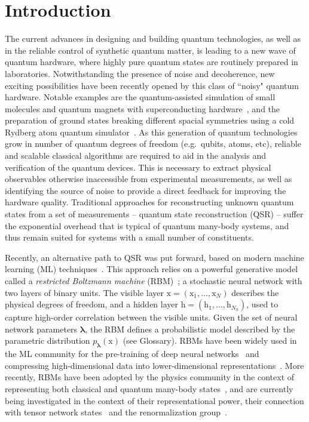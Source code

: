 \documentclass[submission, Phys, hidelinks]{SciPost}
\begin{document}
\section{Introduction}
The current advances in designing and building quantum technologies, as well as in the reliable control of synthetic quantum matter, is leading to a new wave of quantum hardware, where highly pure quantum states are routinely prepared in laboratories. Notwithstanding the presence of noise and decoherence, new exciting possibilities have been recently opened by this class of ``noisy" quantum hardware. Notable examples are the quantum-assisted simulation of small molecules and quantum magnets with superconducting hardware~\cite{gambetta17,gambetta18}, and the preparation of ground states breaking different spacial symmetries using a cold Rydberg atom quantum simulator~\cite{Bernien17}. As this generation of quantum technologies grow in number of quantum degrees of freedom (e.g.~qubits, atoms, etc), reliable and scalable classical algorithms are required to aid in the analysis and verification of the quantum devices. This is necessary to extract physical observables otherwise inaccessible from experimental measurements, as well as identifying the source of noise to provide a direct feedback for improving the hardware quality. Traditional approaches for reconstructing unknown quantum states from a set of measurements -- quantum state reconstruction (QSR) -- suffer the exponential overhead that is typical of quantum many-body systems, and thus remain suited for systems with a small number of constituents. 

Recently, an alternative path to QSR was put forward, based on modern machine learning (ML) techniques~\cite{torlai2018tomography,TorlaiMixed}. This approach relies on a powerful generative model called a {\it restricted Boltzmann machine} (RBM)~\cite{Smolensky}; a stochastic neural network with two layers of binary units. The visible layer $\bm{\mathrm{x}}=(\mathrm{x}_1,\dots,\mathrm{x}_N)$ describes the physical degrees of freedom, and a hidden layer $\bm{\mathrm{h}}=(\mathrm{h}_1,\dots,\mathrm{h}_{N_h})$, used to capture high-order correlation between the visible units. Given the set of neural network parameters $\bm{\lambda}$, the RBM defines a probabilistic model described by the parametric distribution $p_{\bm{\lambda}}(\bm{\mathrm{x}})$ (see Glossary). RBMs have been widely used in the ML community for the pre-training of deep neural networks~\cite{Hinton06} and compressing high-dimensional data into lower-dimensional representations~\cite{Hinton504}. More recently, RBMs have been adopted by the physics community in the context of representing both classical and quantum many-body states~\cite{Torlai2016thermo, CarleoTroyer2017Science}, and are currently being investigated in the context of their representational power, their connection with tensor network states~\cite{GlasserCirac2018} and the renormalization group~\cite{Maciej}.
\end{document}
